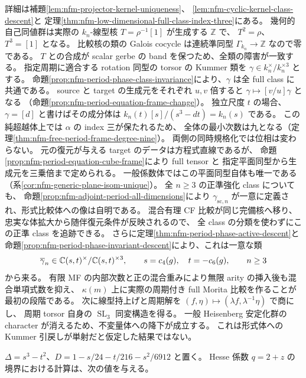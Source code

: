 詳細は補題\ref{lem:nfm-projector-kernel-uniqueness}、
\ref{lem:nfm-cyclic-kernel-class-descent}と
定理\ref{thm:nfm-low-dimensional-full-class-index-three}にある。
幾何的自己同値群は実際の $k_n$-線型核 $T=\rho^{-1}[1]$ が生成する $\mathbb Z$ で、
$T^2=\rho$、$T^3=[1]$ となる。
比較核の類の Galois cocycle は連続準同型 $\Gamma_{k_n}\to\mathbb Z$ なので零である。
$T$ との合成が scalar gerbe の band を保つため、全類の障害が一致する。
指定周期に適合する rotation 同型の torsor の Kummer 類を
$\gamma\in k_n^\times/k_n^{\times3}$ とする。
命題\ref{prop:nfm-period-phase-class-invariance}により、$\gamma$ は全 full class に共通である。
source と target の生成元をそれぞれ $u,v$ 倍すると
$\gamma\mapsto[v/u]\gamma$ となる
（命題\ref{prop:nfm-period-equation-frame-change}）。
独立尺度 $t$ の場合、$\gamma=[d]$ と書けばその成分体は
$k_n(t)[s]/(s^3-dt)=k_n(s)$ である。
この純超越体上では $\alpha$ の index 三が保たれるため、
全体の最小次数は九となる（定理\ref{thm:nfm-free-period-frame-degree-nine}）。
両側の同時規格化では位相は変わらない。
元の復元が与える target のデータは方程式直線であるが、
命題\ref{prop:nfm-period-equation-cube-frame}により full tensor と
指定平面同型から生成元を三乗倍まで定められる。
一般係数体ではこの平面同型自体も唯一である
（系\ref{cor:nfm-generic-plane-isom-unique}）。
全 $n\ge3$ の正準強化 class についても、
命題\ref{prop:nfm-adjoint-period-all-dimensions}により
$\gamma_{\mathrm{sc},n}$ が一意に定義され、形式比較体への像は自明である。
混合有理 CF 比較が同じ完備核へ移り、忠実な体拡大から随伴復元条件が反映されるので、
全 class の分類を使わずにこの正準 class を追跡できる。
さらに定理\ref{thm:nfm-period-phase-active-descent}と
命題\ref{prop:nfm-period-phase-invariant-descent}により、これは一意な類
\[
 \overline\gamma_n\in\mathbb C(s,t)^\times/\mathbb C(s,t)^{\times3},
 \qquad s=c_4(g),\quad t=-c_6(g),\qquad n\ge3
\]
から来る。
有限 MF の内部次数と正の混合重みにより無限 arity の挿入後も混合単項式数を抑え、
$\kappa(m)$ 上に実際の周期付き full Morita 比較を作ることが最初の段階である。
次に線型持上げと周期解を $(f,\eta)\mapsto(\lambda f,\lambda^{-1}\eta)$ で商にし、
周期 torsor 自身の $\operatorname{SL}_3$ 同変構造を得る。
一般 Heisenberg 安定化群の character が消えるため、不変量体への降下が成立する。
これは形式体への Kummer 引戻しが単射だと仮定した結果ではない。

$\Delta=s^3-t^2$、$D=1-s/24-t/216-s^2/6912$ と置く。
Hesse 係数 $q=2+z$ の境界における計算は、次の値を与える。


